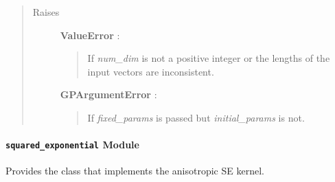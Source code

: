 \documentclass[letterpaper,10pt,english]{sphinxmanual}
\begin{document}
\begin{fulllineitems}
\begin{quote}
\begin{description}
\item[{Raises }] \leavevmode
\textbf{ValueError} :
\begin{quote}

If \emph{num\_dim} is not a positive integer or the lengths of
the input vectors are inconsistent.
\end{quote}

\textbf{GPArgumentError} :
\begin{quote}

If \emph{fixed\_params} is passed but \emph{initial\_params} is not.
\end{quote}

\end{description}\end{quote}

\end{fulllineitems}



\paragraph{\texttt{squared\_exponential} Module}
\label{gptools.kernel:squared-exponential-module}\label{gptools.kernel:module-gptools.kernel.squared_exponential}
Provides the {\hyperref[gptools.kernel:gptools.kernel.squared_exponential.SquaredExponentialKernel]{}} class that implements the anisotropic SE kernel.
\end{document}
